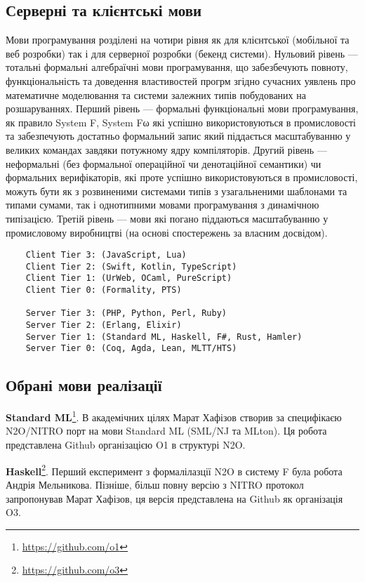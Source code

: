 \subsection{Серверні та клієнтські мови}
Мови програмування розділені на чотири рівня як для клієнтської
(мобільної та веб розробки) так і для серверної розробки (бекенд
системи). Нульовий рівень — тотальні формальні алгебраїчні мови
програмування, що забезбечують повноту, функціональність та доведення
властивостей прогрм згідно сучасних уявлень про математичне моделювання
та системи залежних типів побудованих на розшаруваннях. Перший
рівень — формальні функціональні мови програмування, як правило
System F, System Fω які успішно використовуються в промисловості
та забезпечують достатньо формальний запис який піддається
масштабуванню у великих командах завдяки потужному ядру компіляторів.
Другий рівень — неформальні (без формальної операційної чи денотаційної
семантики) чи формальних верифікаторів, які проте успішно
використовуються в промисловості, можуть бути як з розвиненими
системами типів з узагальненими шаблонами та типами сумами,
так і однотипними мовами програмування з динамічною типізацією.
Третій рівень — мови які погано піддаються масштабуванню у
промисловому виробництві (на основі спостережень за власним досвідом).

\begin{lstlisting}
    Client Tier 3: (JavaScript, Lua)
    Client Tier 2: (Swift, Kotlin, TypeScript)
    Client Tier 1: (UrWeb, OCaml, PureScript)
    Client Tier 0: (Formality, PTS)

    Server Tier 3: (PHP, Python, Perl, Ruby)
    Server Tier 2: (Erlang, Elixir)
    Server Tier 1: (Standard ML, Haskell, F#, Rust, Hamler)
    Server Tier 0: (Coq, Agda, Lean, MLTT/HTS)
\end{lstlisting}

\subsection{Обрані мови реалізації}

\textbf{Standard ML}\footnote{\url{https://github.com/o1}}. В академічних цілях Марат Хафізов створив
за специфікаєю N2O/NITRO порт на мови Standard ML (SML/NJ та MLton).
Ця робота представлена Github організацією O1 в структурі N2O.

\textbf{Haskell}\footnote{\url{https://github.com/o3}}. Перший експеримент з формалілазції N2O в систему F
була робота Андрія Мельникова. Пізніше, більш повну версію з NITRO протокол
запропонував Марат Хафізов, ця версія представлена на Github як організація O3.

